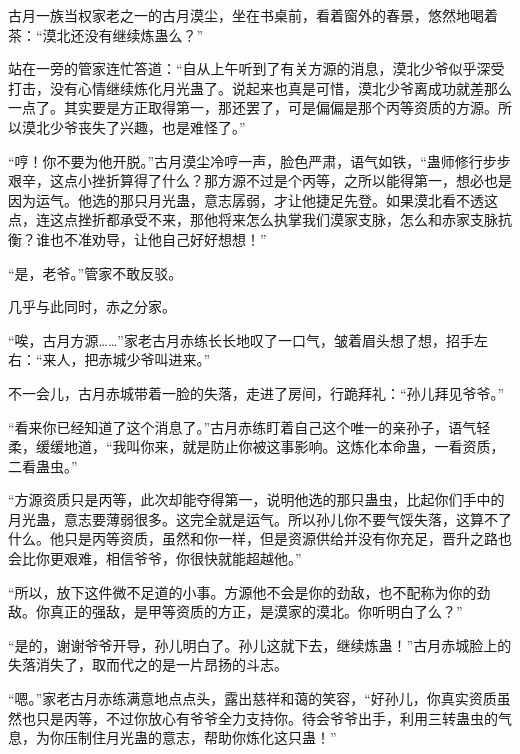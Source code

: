 \begin{this_body}
古月一族当权家老之一的古月漠尘，坐在书桌前，看着窗外的春景，悠然地喝着茶：“漠北还没有继续炼蛊么？”

站在一旁的管家连忙答道：“自从上午听到了有关方源的消息，漠北少爷似乎深受打击，没有心情继续炼化月光蛊了。说起来也真是可惜，漠北少爷离成功就差那么一点了。其实要是方正取得第一，那还罢了，可是偏偏是那个丙等资质的方源。所以漠北少爷丧失了兴趣，也是难怪了。”

“哼！你不要为他开脱。”古月漠尘冷哼一声，脸色严肃，语气如铁，“蛊师修行步步艰辛，这点小挫折算得了什么？那方源不过是个丙等，之所以能得第一，想必也是因为运气。他选的那只月光蛊，意志孱弱，才让他捷足先登。如果漠北看不透这点，连这点挫折都承受不来，那他将来怎么执掌我们漠家支脉，怎么和赤家支脉抗衡？谁也不准劝导，让他自己好好想想！”

“是，老爷。”管家不敢反驳。

几乎与此同时，赤之分家。

“唉，古月方源……”家老古月赤练长长地叹了一口气，皱着眉头想了想，招手左右：“来人，把赤城少爷叫进来。”

不一会儿，古月赤城带着一脸的失落，走进了房间，行跪拜礼：“孙儿拜见爷爷。”

“看来你已经知道了这个消息了。”古月赤练盯着自己这个唯一的亲孙子，语气轻柔，缓缓地道，“我叫你来，就是防止你被这事影响。这炼化本命蛊，一看资质，二看蛊虫。”

“方源资质只是丙等，此次却能夺得第一，说明他选的那只蛊虫，比起你们手中的月光蛊，意志要薄弱很多。这完全就是运气。所以孙儿你不要气馁失落，这算不了什么。他只是丙等资质，虽然和你一样，但是资源供给并没有你充足，晋升之路也会比你更艰难，相信爷爷，你很快就能超越他。”

“所以，放下这件微不足道的小事。方源他不会是你的劲敌，也不配称为你的劲敌。你真正的强敌，是甲等资质的方正，是漠家的漠北。你听明白了么？”

“是的，谢谢爷爷开导，孙儿明白了。孙儿这就下去，继续炼蛊！”古月赤城脸上的失落消失了，取而代之的是一片昂扬的斗志。

“嗯。”家老古月赤练满意地点点头，露出慈祥和蔼的笑容，“好孙儿，你真实资质虽然也只是丙等，不过你放心有爷爷全力支持你。待会爷爷出手，利用三转蛊虫的气息，为你压制住月光蛊的意志，帮助你炼化这只蛊！”

\end{this_body}

